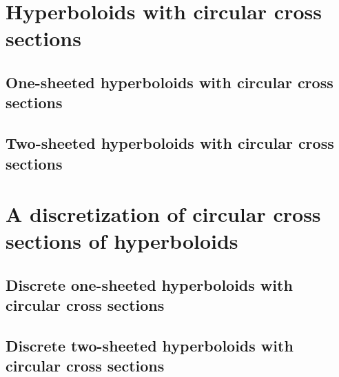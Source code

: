 \documentclass[12pt,a4paper]{article}
\theoremstyle{definition}
\theoremstyle{remark}
\begin{document}
\section{Hyperboloids with circular cross sections}
\subsection{One-sheeted hyperboloids with circular cross sections}
\subsection{Two-sheeted hyperboloids with circular cross sections}
\pagebreak
\section{A discretization of circular cross sections of hyperboloids}
\subsection{Discrete one-sheeted hyperboloids with circular cross sections}
\cite{DiscretizationConfocalQuadricsI}
\subsection{Discrete two-sheeted hyperboloids with circular cross sections}
\pagebreak




\end{document}
